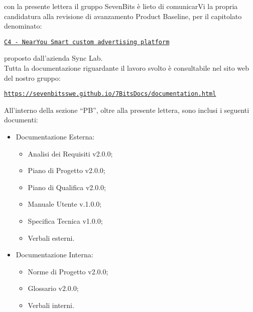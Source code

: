 \documentclass[10pt]{article}
\begin{document}
con la presente lettera il gruppo SevenBits è lieto di comunicarVi la propria candidatura alla revisione di avanzamento Product Baseline, per il capitolato denominato:
\begin{center}
\textcolor{blue}{\texttt{\href{https://www.math.unipd.it/~tullio/IS-1/2024/Progetto/C4.pdf}{C4 - NearYou Smart custom advertising platform}}}\\
\end{center}
proposto dall'azienda Sync Lab.\\
Tutta la documentazione riguardante il lavoro svolto è consultabile nel sito web del nostro gruppo:
\begin{center}
\textcolor{blue}{\texttt{\url{https://sevenbitsswe.github.io/7BitsDocs/documentation.html}}}\\
\end{center}
All'interno della sezione ``PB'', oltre alla presente lettera, sono inclusi i seguenti documenti:
\begin{itemize}
\item Documentazione Esterna:
  \begin{itemize}
    \item Analisi dei Requisiti v2.0.0;
    \item Piano di Progetto v2.0.0;
    \item Piano di Qualifica v2.0.0;
    \item Manuale Utente v.1.0.0;
    \item Specifica Tecnica v1.0.0;
    \item Verbali esterni.
  \end{itemize}
\item Documentazione Interna:
  \begin{itemize}
    \item Norme di Progetto v2.0.0;
    \item Glossario v2.0.0;
    \item Verbali interni.
  \end{itemize}
\end{itemize}
\end{document}
